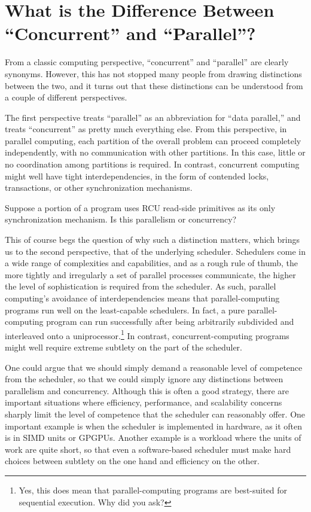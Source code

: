 
\section{What is the Difference Between ``Concurrent'' and ``Parallel''?}
\label{sec:app:questions:What is the Difference Between ``Concurrent'' and ``Parallel''?}

From a classic computing perspective, ``concurrent'' and ``parallel''
are clearly synonyms.
However, this has not stopped many people from drawing distinctions
between the two, and it turns out that these distinctions can be
understood from a couple of different perspectives.

The first perspective treats ``parallel'' as an abbreviation for
``data parallel,'' and treats ``concurrent'' as pretty much everything
else.
From this perspective, in parallel computing, each partition of the
overall problem can proceed completely independently, with no
communication with other partitions.
In this case, little or no coordination among partitions is required.
In contrast, concurrent computing might well have tight interdependencies,
in the form of contended locks, transactions, or other synchronization
mechanisms.

\QuickQuiz{}
	Suppose a portion of a program uses RCU read-side primitives
	as its only synchronization mechanism.
	Is this parallelism or concurrency?
 \QuickQuizEnd

This of course begs the question of why such a distinction matters,
which brings us to the second perspective, that of the underlying scheduler.
Schedulers come in a wide range of complexities and capabilities, and
as a rough rule of thumb, the more tightly and irregularly a set of
parallel processes communicate, the higher the level of sophistication
is required from the scheduler.
As such, parallel computing's avoidance of interdependencies means that
parallel-computing programs run well on the least-capable schedulers.
In fact, a pure parallel-computing program can run successfully after
being arbitrarily subdivided and interleaved onto a uniprocessor.\footnote{
	Yes, this does mean that parallel-computing programs are
	best-suited for sequential execution.
	Why did you ask?}
In contrast, concurrent-computing programs might well require extreme
subtlety on the part of the scheduler.

One could argue that we should simply demand a reasonable level of
competence from the scheduler, so that we could simply ignore any
distinctions between parallelism and concurrency.
Although this is often a good strategy,
there are important situations where efficiency,
performance, and scalability concerns sharply limit the level
of competence that the scheduler can reasonably offer.
One important example is when the scheduler is implemented in
hardware, as it often is in SIMD units or GPGPUs.
Another example is a workload where the units of work are quite
short, so that even a software-based scheduler must make hard choices
between subtlety on the one hand and efficiency on the other.

